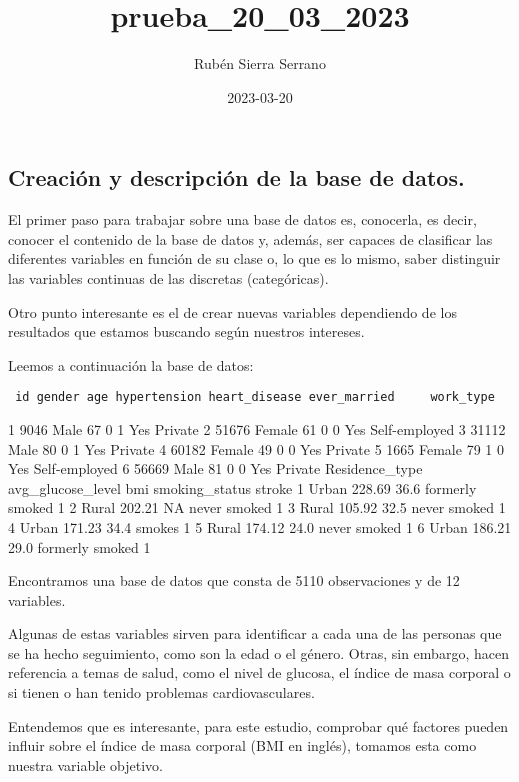 \documentclass[
]{article}
\title{prueba\_20\_03\_2023}
\author{Rubén Sierra Serrano}
\date{2023-03-20}
\begin{document}
\maketitle

\hypertarget{creaciuxf3n-y-descripciuxf3n-de-la-base-de-datos.}{%
\subsection{Creación y descripción de la base de
datos.}\label{creaciuxf3n-y-descripciuxf3n-de-la-base-de-datos.}}

El primer paso para trabajar sobre una base de datos es, conocerla, es
decir, conocer el contenido de la base de datos y, además, ser capaces
de clasificar las diferentes variables en función de su clase o, lo que
es lo mismo, saber distinguir las variables continuas de las discretas
(categóricas).

Otro punto interesante es el de crear nuevas variables dependiendo de
los resultados que estamos buscando según nuestros intereses.

Leemos a continuación la base de datos:

\begin{verbatim}
 id gender age hypertension heart_disease ever_married     work_type
\end{verbatim}

1 9046 Male 67 0 1 Yes Private 2 51676 Female 61 0 0 Yes Self-employed 3
31112 Male 80 0 1 Yes Private 4 60182 Female 49 0 0 Yes Private 5 1665
Female 79 1 0 Yes Self-employed 6 56669 Male 81 0 0 Yes Private
Residence\_type avg\_glucose\_level bmi smoking\_status stroke 1 Urban
228.69 36.6 formerly smoked 1 2 Rural 202.21 NA never smoked 1 3 Rural
105.92 32.5 never smoked 1 4 Urban 171.23 34.4 smokes 1 5 Rural 174.12
24.0 never smoked 1 6 Urban 186.21 29.0 formerly smoked 1

Encontramos una base de datos que consta de 5110 observaciones y de 12
variables.

Algunas de estas variables sirven para identificar a cada una de las
personas que se ha hecho seguimiento, como son la edad o el género.
Otras, sin embargo, hacen referencia a temas de salud, como el nivel de
glucosa, el índice de masa corporal o si tienen o han tenido problemas
cardiovasculares.

Entendemos que es interesante, para este estudio, comprobar qué factores
pueden influir sobre el índice de masa corporal (BMI en inglés), tomamos
esta como nuestra variable objetivo.
\end{document}
